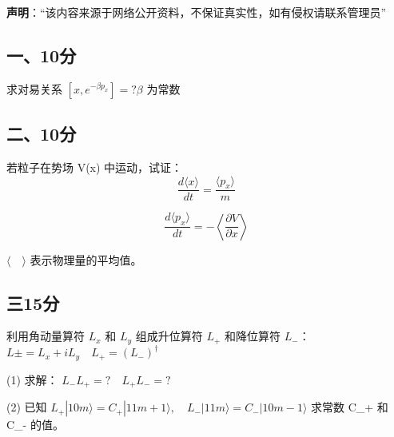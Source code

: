 
\textbf{声明}：“该内容来源于网络公开资料，不保证真实性，如有侵权请联系管理员”

\subsection{一、10分}
求对易关系 $[x, e^{-\beta p_x}] = ? \beta$ 为常数
\subsection{二、10分}
若粒子在势场  V(x) 中运动，试证：
$$\frac{d \langle x \rangle}{dt} = \frac{\langle p_x \rangle}{m}~$$

$$\frac{d \langle p_x \rangle}{dt} = -\left\langle \frac{\partial V}{\partial x} \right\rangle~$$

$\langle \quad \rangle$ 表示物理量的平均值。
\subsection{三15分}
利用角动量算符 $L_x$ 和 $L_y$ 组成升位算符 $L_+$ 和降位算符 $L_-$：
$L\pm = L_x + i L_y \quad L_+ = (L_-)^\dagger$

(1) 求解： $L_- L_+ = ? \quad L_+ L_- = ?$

(2) 已知 $L_+ | 1 0 m \rangle = C_+ | 1 1 m + 1 \rangle, \quad L_- | 1 1 m \rangle = C_- | 1 0 m - 1 \rangle$
求常数 C_+ 和 C_- 的值。